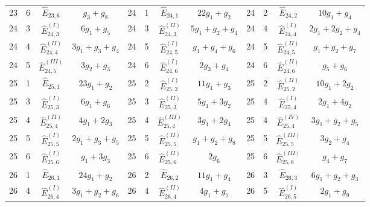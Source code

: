 \documentclass[a4paper,11pt]{article}
\begin{document}
\begin{table}
\begin{center}
{\begin{tabular}{|cccc|cccc|cccc|}
23  &  6  &  $\widehat{E}_{23,6}$  &  $g_{3}+g_{8}$    &    24  &  1  &  $\widehat{E}_{24,1}$  &  $22g_{1}+g_{2}$    &    24  &  2  &  $\widehat{E}_{24,2}$  &  $10g_{1}+g_{4}$\\
24  &  3  &  $\widehat{E}_{24,3}^{(I)}$  &  $6g_{1}+g_{5}$    &    24  &  3  &  $\widehat{E}_{24,3}^{(II)}$  &  $5g_{1}+g_{2}+g_{4}$    &    24  &  4  &  $\widehat{E}_{24,4}^{(I)}$  &  $2g_{1}+2g_{2}+g_{4}$\\
24  &  4  &  $\widehat{E}_{24,4}^{(II)}$  &  $3g_{1}+g_{3}+g_{4}$    &    24  &  5  &  $\widehat{E}_{24,5}^{(I)}$  &  $g_{1}+g_{4}+g_{6}$    &    24  &  5  &  $\widehat{E}_{24,5}^{(II)}$  &  $g_{1}+g_{2}+g_{7}$\\
24  &  5  &  $\widehat{E}_{24,5}^{(III)}$  &  $3g_{2}+g_{3}$    &    24  &  6  &  $\widehat{E}_{24,6}^{(I)}$  &  $2g_{3}+g_{4}$    &    24  &  6  &  $\widehat{E}_{24,6}^{(II)}$  &  $g_{5}+g_{6}$\\
25  &  1  &  $\widehat{E}_{25,1}$  &  $23g_{1}+g_{2}$    &    25  &  2  &  $\widehat{E}_{25,2}^{(I)}$  &  $11g_{1}+g_{3}$    &    25  &  2  &  $\widehat{E}_{25,2}^{(II)}$  &  $10g_{1}+2g_{2}$\\
25  &  3  &  $\widehat{E}_{25,3}^{(I)}$  &  $6g_{1}+g_{6}$    &    25  &  3  &  $\widehat{E}_{25,3}^{(II)}$  &  $5g_{1}+3g_{2}$    &    25  &  4  &  $\widehat{E}_{25,4}^{(I)}$  &  $2g_{1}+4g_{2}$\\
25  &  4  &  $\widehat{E}_{25,4}^{(II)}$  &  $4g_{1}+2g_{3}$    &    25  &  4  &  $\widehat{E}_{25,4}^{(III)}$  &  $3g_{1}+2g_{4}$    &    25  &  4  &  $\widehat{E}_{25,4}^{(IV)}$  &  $3g_{1}+g_{2}+g_{5}$\\
25  &  5  &  $\widehat{E}_{25,5}^{(I)}$  &  $2g_{1}+g_{3}+g_{5}$    &    25  &  5  &  $\widehat{E}_{25,5}^{(II)}$  &  $g_{1}+g_{2}+g_{8}$    &    25  &  5  &  $\widehat{E}_{25,5}^{(III)}$  &  $3g_{2}+g_{4}$\\
25  &  6  &  $\widehat{E}_{25,6}^{(I)}$  &  $g_{1}+3g_{3}$    &    25  &  6  &  $\widehat{E}_{25,6}^{(II)}$  &  $2g_{6}$    &    25  &  6  &  $\widehat{E}_{25,6}^{(III)}$  &  $g_{4}+g_{7}$\\
26  &  1  &  $\widehat{E}_{26,1}$  &  $24g_{1}+g_{2}$    &    26  &  2  &  $\widehat{E}_{26,2}$  &  $11g_{1}+g_{4}$    &    26  &  3  &  $\widehat{E}_{26,3}$  &  $6g_{1}+g_{2}+g_{3}$\\
26  &  4  &  $\widehat{E}_{26,4}^{(I)}$  &  $3g_{1}+g_{2}+g_{6}$    &    26  &  4  &  $\widehat{E}_{26,4}^{(II)}$  &  $4g_{1}+g_{7}$    &    26  &  5  &  $\widehat{E}_{26,5}^{(I)}$  &  $2g_{1}+g_{9}$\\

\end{tabular}}
\end{center}
\end{table}
\end{document}
